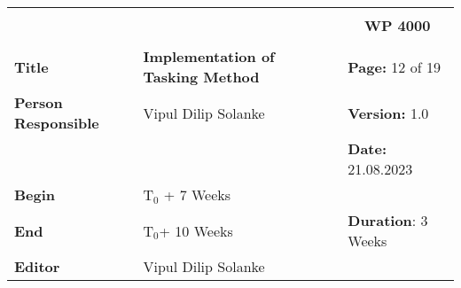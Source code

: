 \begin{table}[!h]
  \begin{center}
    \begin{tabular}{|p{35mm}||p{55mm}|p{50mm}||p{40mm}|}
      \hline
      \multicolumn{3}{|l||}{\textbf{}} & \multicolumn{1}{c|}{}                                                                                                                                                \\
      \multicolumn{3}{|l||}{\textbf{}} & \multicolumn{1}{c|}{\textbf{WP 4000}}                                                                                                                                \\
      \multicolumn{3}{|l||}{\textbf{}} & \multicolumn{1}{c|}{}                                                                                                                                                \\
      \hline\hline
      \textbf{Title}                   & \multicolumn{2}{p{7cm}||}{\textbf{Implementation of Tasking Method}}
                                       & \textbf{Page:} 12 of 19                                                                                                                                             \\
      \hline
      \textbf{Person Responsible}        & \multicolumn{2}{l||}{Vipul Dilip Solanke}                                                                                                   & \textbf{Version:} 1.0   \\
      \hline
      \multicolumn{3}{|l||}{}          & \textbf{Date:} 21.08.2023                                                                                                                                          \\
      \hline\hline
      \textbf{Begin}                  & \multicolumn{2}{l||}{T$_0$ + 7 Weeks}                                                                                                                &                         \\
      \hline
      \textbf{End}                    & \multicolumn{2}{l||}{T$_0$+ 10 Weeks}                                                                                                        & \textbf{Duration}: 3 Weeks \\
      \hline\hline
      \textbf{Editor}              & \multicolumn{3}{l|}{Vipul Dilip Solanke}                                                                                                                              \\

\end{tabular}
\end{center}
\end{table}
